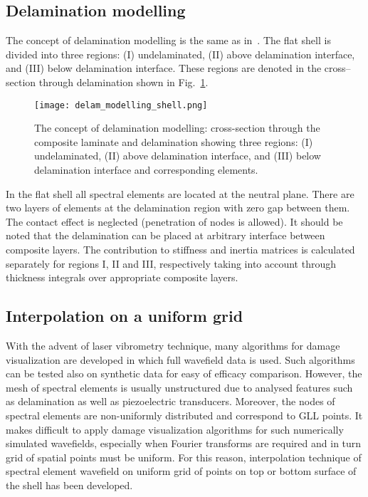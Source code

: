 \documentclass[preprint,12pt]{elsarticle}
\begin{document}
	\subsection{Delamination modelling \label{sec:delam_model}}
	The concept of delamination modelling is the same as in~\cite{Kudela2009}. The flat shell is divided into three regions: (I) undelaminated, (II) above delamination interface, and (III) below delamination interface. These regions are denoted in the cross--section through delamination shown in Fig.~\ref{fig:delam_modelling_shell}. 
	\begin{figure} [h!]
		\centering
		\texttt{[image: delam\_modelling\_shell.png]}	
		\caption{The concept of delamination modelling: cross-section through the composite laminate and delamination showing three regions: (I) undelaminated, (II) above delamination interface, and (III) below delamination interface and corresponding elements.}
		\label{fig:delam_modelling_shell}
	\end{figure}
	In the flat shell all spectral elements are located at the neutral plane. There are two layers of elements at the delamination region with zero gap between them. The contact effect is neglected (penetration of nodes is allowed). It should be noted that the delamination can be placed at arbitrary interface between composite layers. The contribution to stiffness and inertia matrices is calculated separately for regions I, II and III, respectively taking into account through thickness integrals over appropriate composite layers.
	\subsection{Interpolation on a uniform grid}
	With the advent of laser vibrometry technique, many algorithms for damage visualization  are developed in which full wavefield data is used. Such algorithms can be tested also on synthetic data for easy of efficacy comparison. However, the mesh of spectral elements is usually unstructured due to analysed features such as delamination as well as piezoelectric transducers. Moreover, the nodes of spectral elements are non-uniformly distributed and correspond to GLL points. It makes difficult to apply damage visualization algorithms for such numerically simulated wavefields, especially when Fourier transforms are required and in turn grid of spatial points must be uniform. For this reason, interpolation technique of spectral element wavefield on uniform grid of points on top or bottom surface of the shell has been developed. 
	
\end{document}
